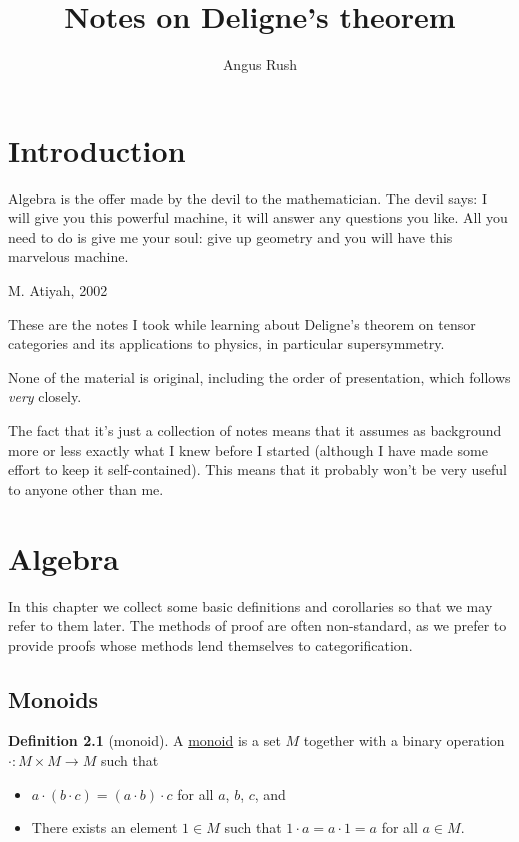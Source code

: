 \documentclass[a4paper]{report}
\title{Notes on Deligne's theorem}
\author{Angus Rush}
\newcommand{\defn}[1]{\ul{#1}}
\theoremstyle{definition}
\newtheorem{definition}{Definition}[section]
\theoremstyle{plain}
\theoremstyle{remark}
\begin{document}
 
\maketitle
\tableofcontents 

\chapter{Introduction}
\epigraph{Algebra is the offer made by the devil to the mathematician. The devil says: I will give you this powerful machine, it will answer any questions you like. All you need to do is give me your soul: give up geometry and you will have this marvelous machine.}{M. Atiyah, 2002}

These are the notes I took while learning about Deligne's theorem on tensor categories and its applications to physics, in particular supersymmetry. 

None of the material is original, including the order of presentation, which follows \cite{nlab-deligne-theorem} \emph{very} closely.

The fact that it's just a collection of notes means that it assumes as background more or less exactly what I knew before I started (although I have made some effort to keep it self-contained). This means that it probably won't be very useful to anyone other than me.

\chapter{Algebra}

In this chapter we collect some basic definitions and corollaries so that we may refer to them later. The methods of proof are often non-standard, as we prefer to provide proofs whose methods lend themselves to categorification.
\section{Monoids}
\begin{definition}[monoid]
  \label{def:monoid}
  A \defn{monoid} is a set $M$ together with a binary operation $\cdot\colon M \times M \to M$ such that
  \begin{itemize}
    \item $a \cdot (b \cdot c)=(a \cdot b) \cdot c$ for all $a$, $b$, $c$, and
    \item There exists an element $1 \in M$ such that $1 \cdot a=a \cdot 1=a$ for all $a \in M$.
  \end{itemize}
\end{definition}
\end{document}
